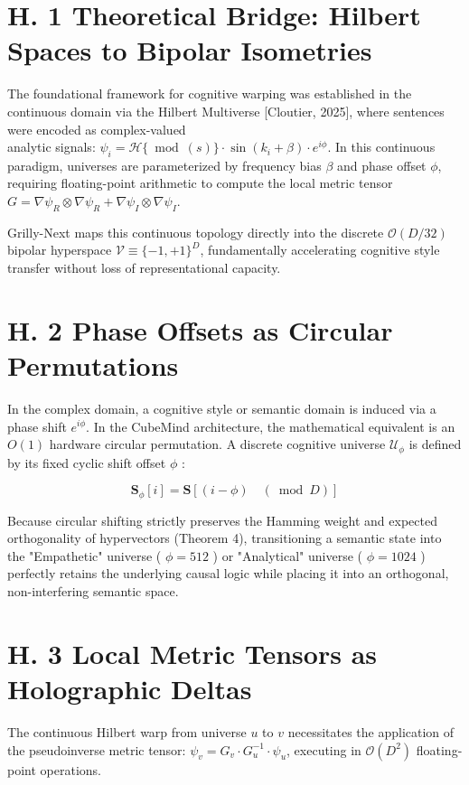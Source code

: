 \documentclass[10pt]{article}
\begin{document}
\section*{H. 1 Theoretical Bridge: Hilbert Spaces to Bipolar Isometries}
The foundational framework for cognitive warping was established in the continuous domain via the Hilbert Multiverse [Cloutier, 2025], where sentences were encoded as complex-valued\\
analytic signals: $\psi_{i}=\mathcal{H}\{\bmod (s)\} \cdot \sin \left(k_{i}+\beta\right) \cdot e^{i \phi}$. In this continuous paradigm, universes are parameterized by frequency bias $\beta$ and phase offset $\phi$, requiring floating-point arithmetic to compute the local metric tensor $G=\nabla \psi_{R} \otimes \nabla \psi_{R}+\nabla \psi_{I} \otimes \nabla \psi_{I}$.

Grilly-Next maps this continuous topology directly into the discrete $\mathcal{O}(D / 32)$ bipolar hyperspace $\mathcal{V} \equiv\{-1,+1\}^{D}$, fundamentally accelerating cognitive style transfer without loss of representational capacity.

\section*{H. 2 Phase Offsets as Circular Permutations}
In the complex domain, a cognitive style or semantic domain is induced via a phase shift $e^{i \phi}$. In the CubeMind architecture, the mathematical equivalent is an $O(1)$ hardware circular permutation. A discrete cognitive universe $\mathcal{U}_{\phi}$ is defined by its fixed cyclic shift offset $\phi$ :

$$
\mathbf{S}_{\phi}[i]=\mathbf{S}[(i-\phi) \quad(\bmod D)]
$$

Because circular shifting strictly preserves the Hamming weight and expected orthogonality of hypervectors (Theorem 4), transitioning a semantic state into the "Empathetic" universe ( $\phi=512$ ) or "Analytical" universe ( $\phi=1024$ ) perfectly retains the underlying causal logic while placing it into an orthogonal, non-interfering semantic space.

\section*{H. 3 Local Metric Tensors as Holographic Deltas}
The continuous Hilbert warp from universe $u$ to $v$ necessitates the application of the pseudoinverse metric tensor: $\psi_{v}=G_{v} \cdot G_{u}^{-1} \cdot \psi_{u}$, executing in $\mathcal{O}\left(D^{2}\right)$ floating-point operations.
\end{document}
